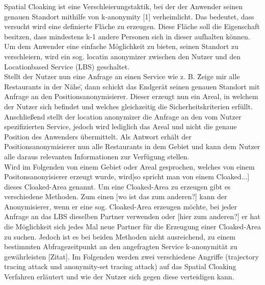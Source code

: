 Spatial Cloaking ist eine Verschleierungstaktik, bei der der Anwender seinen genauen Standort mithilfe von k-anonymity [1] verheimlicht. Das bedeutet, dass versucht wird eine definierte Fläche zu erzeugen. Diese Fläche soll die Eigenschaft besitzen, dass mindestens k-1 andere Personen sich in dieser aufhalten können. Um dem Anwender eine einfache Möglichkeit zu bieten, seinen Standort zu verschleiern, wird ein sog. locatin anonymizer zwischen den Nutzer und den Locationbased Service (LBS) geschaltet. \\ Stellt der Nutzer nun eine Anfrage an einen Service wie z. B. \"Zeige mir alle Restaurants in der Nähe\", dann schickt das Endgerät seinen genauen Standort mit Anfrage an den Positionsanonymisierer. Dieser erzeugt nun ein Areal, in welchem der Nutzer sich befindet und welches gleichzeitig die Sicherheitskriterien erfüllt. Anschließend stellt der location anonymizer die Anfrage an den vom Nutzer spezifizierten Service, jedoch wird lediglich das Areal und nicht die genaue Position des Anwenders übermittelt. Als Antwort erhält der Positionsanonymisierer nun alle Restaurants in dem Gebiet und kann dem Nutzer alle daraus relevanten Informationen zur Verfügung stellen.\\ Wird im Folgenden von einem Gebiet oder Areal gesprochen, welches von einem Positonsanonyisierer erzeugt wurde, wird[so spricht man von einem Cloaked...] dieses Cloaked-Area genannt. Um eine Cloaked-Area zu erzeugen gibt es verschiedene Methoden. Zum einen [wo ist das zum anderen?] kann der Anonymisierer, wenn er eine sog. Cloaked-Area erzeugen möchte, bei jeder Anfrage an das LBS dieselben Partner verwenden oder [hier zum anderen?] er hat die Möglichkeit sich jedes Mal neue Partner für die Erzeugung einer Cloaked-Area zu suchen. Jedoch ist es bei beiden Methoden nicht ausreichend, zu einem bestimmten Abfragezeitpunkt an den angefragten Service k-anonymität zu gewährleisten [Zitat]. Im Folgenden werden zwei verschiedene Angriffe (trajectory tracing attack und anonymity-set tracing attack) auf das Spatial Cloaking Verfahren erläutert und wie der Nutzer sich gegen diese verteidigen kann. 
